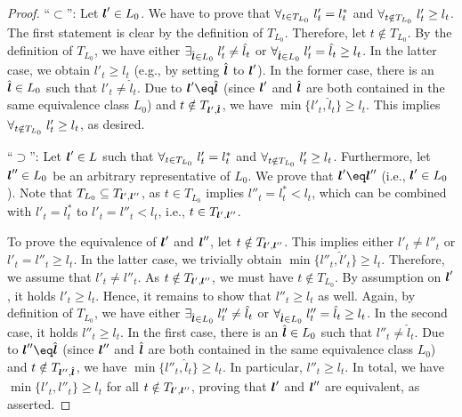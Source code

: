 \begin{proof}
  ``$\subset$'':
  Let ${\boldsymbol{l}}' \in L_0$.
  We have to prove that
  $\forall_{t \in T_{L_0}}\;l'_t = l^\ast_t$ and
  $\forall_{t \notin T_{L_0}}\;l'_t \ge l_t$.
  The first statement is clear by the definition of $T_{L_0}$.
  Therefore, let $t \notin T_{L_0}$.
  By the definition of $T_{L_0}$,
  we have either
  $\exists_{\hat{{\boldsymbol{l}}} \in L_0}\;l'_t \not= \hat{l}_t$ or
  $\forall_{\hat{{\boldsymbol{l}}} \in L_0}\;l'_t = \hat{l}_t \ge l_t$.
  In the latter case, we obtain $l'_t \ge l_t$
  (e.g., by setting $\hat{{\boldsymbol{l}}}$ to ${\boldsymbol{l}}'$).
  In the former case, there is an $\hat{{\boldsymbol{l}}} \in L_0$ such that
  $l'_t \not= \hat{l}_t$.
  Due to $\*l' \eq \hat{\*l}$
  (since ${\boldsymbol{l}}'$ and $\hat{{\boldsymbol{l}}}$ are both contained in the same
  equivalence class $L_0$) and $t \notin T_{{\boldsymbol{l}}',\hat{{\boldsymbol{l}}}}$,
  we have $\min\{l'_t, \hat{l}_t\} \ge l_t$.
  This implies $\forall_{t \notin T_{L_0}}\;l'_t \ge l_t$, as desired.
  
  ``$\supset$'':
  Let ${\boldsymbol{l}}' \in L$ such that
  $\forall_{t \in T_{L_0}}\;l'_t = l^\ast_t$ and
  $\forall_{t \notin T_{L_0}}\;l'_t \ge l_t$.
  Furthermore,
  let ${\boldsymbol{l}}'' \in L_0$ be an arbitrary representative of $L_0$.
  We prove that $\*l' \eq \*l''$ (i.e., ${\boldsymbol{l}}' \in L_0$).
  Note that $T_{L_0} \subseteq T_{{\boldsymbol{l}}',{\boldsymbol{l}}''}$,
  as $t \in T_{L_0}$ implies
  $l''_t = l^\ast_t < l_t$, which can be combined with $l'_t = l^\ast_t$
  to $l'_t = l''_t < l_t$, i.e., $t \in T_{{\boldsymbol{l}}',{\boldsymbol{l}}''}$.
  
  To prove the equivalence of ${\boldsymbol{l}}'$ and ${\boldsymbol{l}}''$,
  let $t \notin T_{{\boldsymbol{l}}',{\boldsymbol{l}}''}$.
  This implies either $l'_t \not= l''_t$ or $l'_t = l''_t \ge l_t$.
  In the latter case, we trivially obtain $\min\{l''_t, \hat{l}'_t\} \ge l_t$.
  Therefore, we assume that $l'_t \not= l''_t$.
  As $t \notin T_{{\boldsymbol{l}}',{\boldsymbol{l}}''}$, we must have $t \notin T_{L_0}$.
  By assumption on ${\boldsymbol{l}}'$, it holds $l'_t \ge l_t$.
  Hence, it remains to show that $l''_t \ge l_t$ as well.
  Again, by definition of $T_{L_0}$, we have either
  $\exists_{\hat{{\boldsymbol{l}}} \in L_0}\;l''_t \not= \hat{l}_t$ or
  $\forall_{\hat{{\boldsymbol{l}}} \in L_0}\;l''_t = \hat{l}_t \ge l_t$.
  In the second case, it holds $l''_t \ge l_t$.
  In the first case, there is an $\hat{{\boldsymbol{l}}} \in L_0$ such that
  $l''_t \not= \hat{l}_t$.
  Due to $\*l'' \eq \hat{\*l}$
  (since ${\boldsymbol{l}}''$ and $\hat{{\boldsymbol{l}}}$ are both contained in the same
  equivalence class $L_0$) and $t \notin T_{{\boldsymbol{l}}'',\hat{{\boldsymbol{l}}}}$,
  we have $\min\{l''_t, \hat{l}_t\} \ge l_t$.
  In particular, $l''_t \ge l_t$.
  In total, we have $\min\{l'_t, l''_t\} \ge l_t$ for all
  $t \notin T_{{\boldsymbol{l}}',{\boldsymbol{l}}''}$, proving that ${\boldsymbol{l}}'$ and ${\boldsymbol{l}}''$ are equivalent,
  as asserted.
\end{proof}

